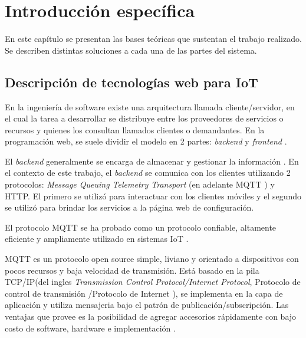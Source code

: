 \chapter{Introducción específica} %

\label{Chapter2}

En este capítulo se presentan las bases teóricas que sustentan el trabajo realizado. Se describen distintas soluciones a cada una de las partes del sistema.

\section{Descripción de tecnologías web para IoT}
\label{sec:Descripción de tecnologías web para IoT}

En la ingeniería de software existe una arquitectura llamada cliente/servidor, en el cual la tarea a desarrollar se  distribuye entre los proveedores de servicios o recursos y quienes los consultan llamados clientes o demandantes. En la programación web, se suele dividir el modelo en 2 partes: \textit{ backend} y \textit{frontend} .

El \textit{backend}  generalmente se encarga de almacenar y gestionar la información \citep{ARTICLE:4}. En el contexto de este trabajo, el \textit{backend} se comunica con los clientes utilizando 2 protocolos: \textit{Message Queuing Telemetry Transport} (en adelante MQTT )  y HTTP. El primero se utilizó para interactuar con los clientes móviles y el segundo se utilizó para brindar los servicios a la página web de configuración.

El protocolo MQTT \citep{ WEBSITE:5} se ha probado como un protocolo confiable, altamente eficiente y ampliamente utilizado en sistemas IoT \citep{ARTICLE:2}.

MQTT es un protocolo open source simple, liviano y orientado a dispositivos con pocos recursos y baja velocidad de transmisión. Está basado en la pila TCP/IP(del ingles \textit{Transmission Control Protocol/Internet Protocol}, Protocolo de control de transmisión /Protocolo de Internet ), se implementa en la capa de aplicación y utiliza mensajeria bajo el patrón de publicación/subscripción. Las ventajas que provee es la posibilidad de agregar accesorios rápidamente con bajo costo de software, hardware e implementación \citep{ARTICLE:2}.

